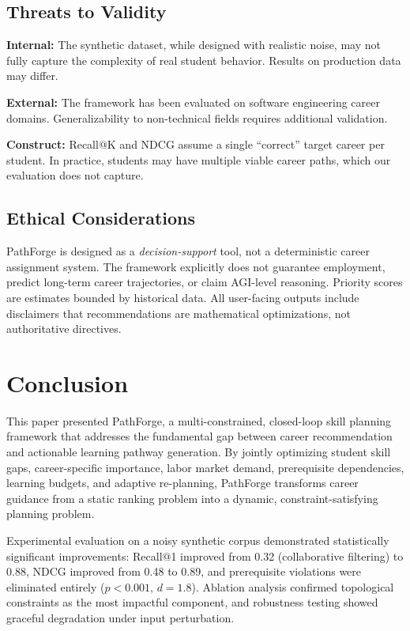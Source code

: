 \documentclass[conference]{IEEEtran}
\begin{document}
\subsection{Threats to Validity}

\textbf{Internal:} The synthetic dataset, while designed with realistic noise, may not fully capture the complexity of real student behavior. Results on production data may differ.

\textbf{External:} The framework has been evaluated on software engineering career domains. Generalizability to non-technical fields requires additional validation.

\textbf{Construct:} Recall@K and NDCG assume a single ``correct'' target career per student. In practice, students may have multiple viable career paths, which our evaluation does not capture.

\subsection{Ethical Considerations}

PathForge is designed as a \emph{decision-support} tool, not a deterministic career assignment system. The framework explicitly does not guarantee employment, predict long-term career trajectories, or claim AGI-level reasoning. Priority scores are estimates bounded by historical data. All user-facing outputs include disclaimers that recommendations are mathematical optimizations, not authoritative directives.

\section{Conclusion}

This paper presented PathForge, a multi-constrained, closed-loop skill planning framework that addresses the fundamental gap between career recommendation and actionable learning pathway generation. By jointly optimizing student skill gaps, career-specific importance, labor market demand, prerequisite dependencies, learning budgets, and adaptive re-planning, PathForge transforms career guidance from a static ranking problem into a dynamic, constraint-satisfying planning problem.

Experimental evaluation on a noisy synthetic corpus demonstrated statistically significant improvements: Recall@1 improved from 0.32 (collaborative filtering) to 0.88, NDCG improved from 0.48 to 0.89, and prerequisite violations were eliminated entirely ($p{<}0.001$, $d{=}1.8$). Ablation analysis confirmed topological constraints as the most impactful component, and robustness testing showed graceful degradation under input perturbation.
\end{document}

